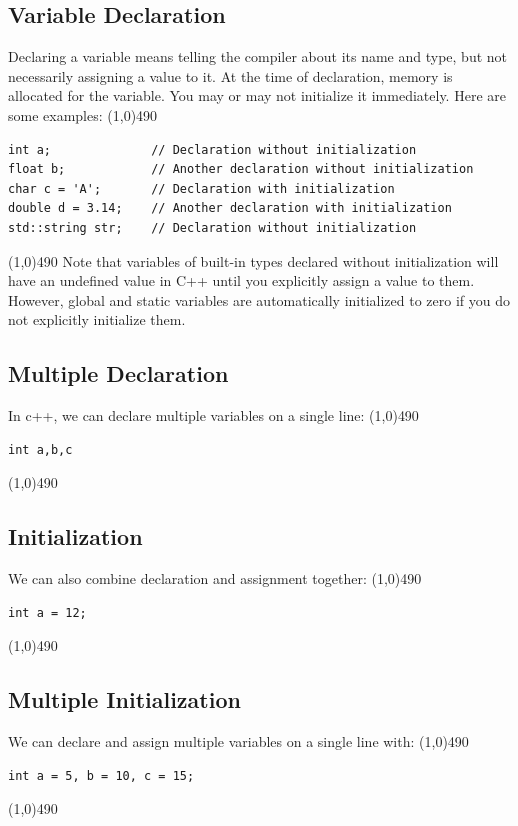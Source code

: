 \documentclass{report}
\begin{document}
    \subsection{Variable Declaration}
    \bigbreak \noindent 
    Declaring a variable means telling the compiler about its name and type, but not necessarily assigning a value to it. At the time of declaration, memory is allocated for the variable. You may or may not initialize it immediately. Here are some examples:
    \bigbreak \noindent 
    \line(1,0){490}
    \begin{verbatim}
int a;              // Declaration without initialization
float b;            // Another declaration without initialization
char c = 'A';       // Declaration with initialization
double d = 3.14;    // Another declaration with initialization
std::string str;    // Declaration without initialization
    \end{verbatim}
    \line(1,0){490}
    \bigbreak \noindent 
    Note that variables of built-in types declared without initialization will have an undefined value in C++ until you explicitly assign a value to them. However, global and static variables are automatically initialized to zero if you do not explicitly initialize them.

    \bigbreak \noindent 
    \subsection{Multiple Declaration}
    \bigbreak \noindent 
    In c++, we can declare multiple variables on a single line:
    \bigbreak \noindent 
    \line(1,0){490}
    \begin{verbatim}
int a,b,c
    \end{verbatim}
    \line(1,0){490}

    \bigbreak \noindent 
    \subsection{Initialization}
    \bigbreak \noindent 
    We can also combine declaration and assignment together:
    \bigbreak \noindent 
    \line(1,0){490}
    \begin{verbatim}
int a = 12;
    \end{verbatim}
    \line(1,0){490}

    \bigbreak \noindent 
    \subsection{Multiple Initialization}
    \bigbreak \noindent 
    We can declare and assign multiple variables on a single line with:
    \bigbreak \noindent 
    \line(1,0){490}
    \begin{verbatim}
int a = 5, b = 10, c = 15;
    \end{verbatim}
    \line(1,0){490}
\end{document}

